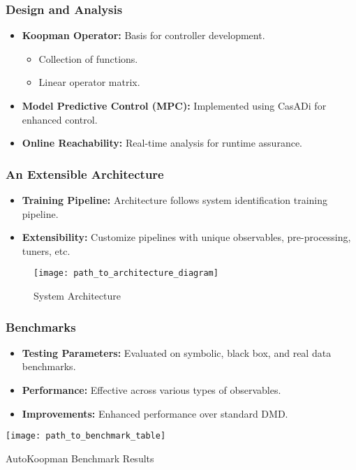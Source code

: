 \documentclass[shortpres,aspectratio=43]{beamer}
\begin{document}
\begin{frame}
\frametitle{Design and Analysis}
\begin{itemize}
    \item<1-> \textbf{Koopman Operator:} Basis for controller development.
    \begin{itemize}
        \item Collection of functions.
        \item Linear operator matrix.
    \end{itemize}
    \item<2-> \textbf{Model Predictive Control (MPC):} Implemented using CasADi for enhanced control.
    \item<3-> \textbf{Online Reachability:} Real-time analysis for runtime assurance.
\end{itemize}
\end{frame}

\begin{frame}
\frametitle{An Extensible Architecture}
\begin{itemize}
    \item<1-> \textbf{Training Pipeline:} Architecture follows system identification training pipeline.
    \item<2-> \textbf{Extensibility:} Customize pipelines with unique observables, pre-processing, tuners, etc.
\end{itemize}
\begin{figure}
  \centering
  \texttt{[image: path\_to\_architecture\_diagram]} %
  \caption{System Architecture}
\end{figure}
\end{frame}

\begin{frame}
\frametitle{Benchmarks}
\begin{itemize}
    \item<1-> \textbf{Testing Parameters:} Evaluated on symbolic, black box, and real data benchmarks.
    \item<2-> \textbf{Performance:} Effective across various types of observables.
    \item<3-> \textbf{Improvements:} Enhanced performance over standard DMD.
\end{itemize}
\begin{table}
  \centering
  \texttt{[image: path\_to\_benchmark\_table]} %
  \caption{AutoKoopman Benchmark Results}
\end{table}
\end{frame}
\end{document}
